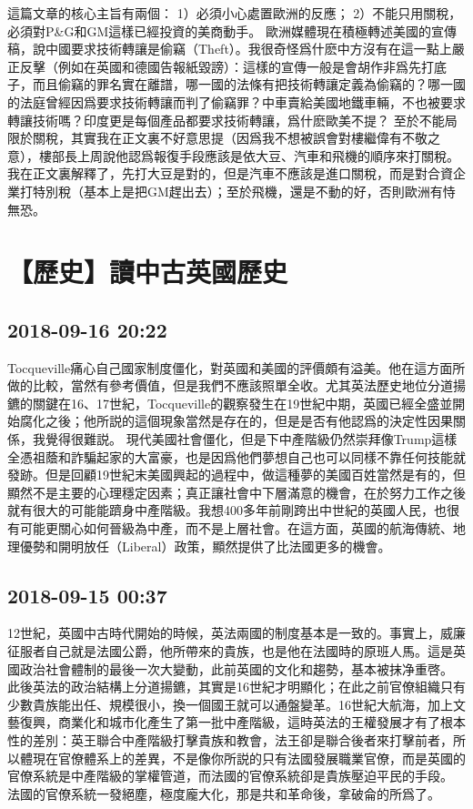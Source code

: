\documentclass[twocolumn]{ctexart}
\begin{document}
這篇文章的核心主旨有兩個：
1）必須小心處置歐洲的反應；
2）不能只用關稅，必須對P\&G和GM這樣已經投資的美商動手。
歐洲媒體現在積極轉述美國的宣傳稿，說中國要求技術轉讓是偷竊（Theft）。我很奇怪爲什麽中方沒有在這一點上嚴正反擊（例如在英國和德國告報紙毀謗）：這樣的宣傳一般是會胡作非爲先打底子，而且偷竊的罪名實在離譜，哪一國的法條有把技術轉讓定義為偷竊的？哪一國的法庭曾經因爲要求技術轉讓而判了偷竊罪？中車賣給美國地鐵車輛，不也被要求轉讓技術嗎？印度更是每個產品都要求技術轉讓，爲什麽歐美不提？
至於不能局限於關稅，其實我在正文裏不好意思提（因爲我不想被誤會對樓繼偉有不敬之意），樓部長上周說他認爲報復手段應該是依大豆、汽車和飛機的順序來打關稅。我在正文裏解釋了，先打大豆是對的，但是汽車不應該是進口關稅，而是對合資企業打特別稅（基本上是把GM趕出去）；至於飛機，還是不動的好，否則歐洲有恃無恐。
\section*{【歷史】讀中古英國歷史}
\subsection*{2018-09-16 20:22}

Tocqueville痛心自己國家制度僵化，對英國和美國的評價頗有溢美。他在這方面所做的比較，當然有參考價值，但是我們不應該照單全收。尤其英法歷史地位分道揚鑣的關鍵在16、17世紀，Tocqueville的觀察發生在19世紀中期，英國已經全盛並開始腐化之後；他所説的這個現象當然是存在的，但是是否有他認爲的決定性因果關係，我覺得很難説。
現代美國社會僵化，但是下中產階級仍然崇拜像Trump這樣全憑祖蔭和詐騙起家的大富豪，也是因爲他們夢想自己也可以同樣不靠任何技能就發跡。但是回顧19世紀末美國興起的過程中，做這種夢的美國百姓當然是有的，但顯然不是主要的心理穩定因素；真正讓社會中下層滿意的機會，在於努力工作之後就有很大的可能能躋身中產階級。我想400多年前剛跨出中世紀的英國人民，也很有可能更關心如何晉級為中產，而不是上層社會。在這方面，英國的航海傳統、地理優勢和開明放任（Liberal）政策，顯然提供了比法國更多的機會。
\subsection*{2018-09-15 00:37}

12世紀，英國中古時代開始的時候，英法兩國的制度基本是一致的。事實上，威廉征服者自己就是法國公爵，他所帶來的貴族，也是他在法國時的原班人馬。這是英國政治社會體制的最後一次大變動，此前英國的文化和趨勢，基本被抹净重啓。
此後英法的政治結構上分道揚鑣，其實是16世紀才明顯化；在此之前官僚組織只有少數貴族能出任、規模很小，換一個國王就可以通盤變革。16世紀大航海，加上文藝復興，商業化和城市化產生了第一批中產階級，這時英法的王權發展才有了根本性的差別：英王聯合中產階級打擊貴族和教會，法王卻是聯合後者來打擊前者，所以體現在官僚體系上的差異，不是像你所説的只有法國發展職業官僚，而是英國的官僚系統是中產階級的掌權管道，而法國的官僚系統卻是貴族壓迫平民的手段。
法國的官僚系統一發絕塵，極度龐大化，那是共和革命後，拿破侖的所爲了。
\end{document}
